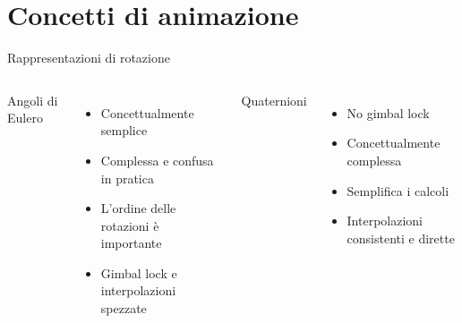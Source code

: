 \documentclass[10pt]{beamer}
\begin{document}
\section{Concetti di animazione}										%
\begin{frame}{Rappresentazioni di rotazione}				%
  \begin{columns}[T,onlytextwidth]									%
    \alert<1>{Angoli di Eulero}
      \begin{itemize}
							\item Concettualmente semplice							%
        \item Complessa e confusa in pratica							%
        \item L'ordine delle rotazioni è importante				%
        \item Gimbal lock e interpolazioni spezzate				%
      \end{itemize}										%

    \alert<2>{Quaternioni}
      \begin{itemize}
        \item No gimbal lock												%
				\item Concettualmente complessa							%
        \item Semplifica i calcoli									%
        \item Interpolazioni consistenti e dirette  %
      \end{itemize}
      

\end{columns}
\end{frame}
\end{document}

